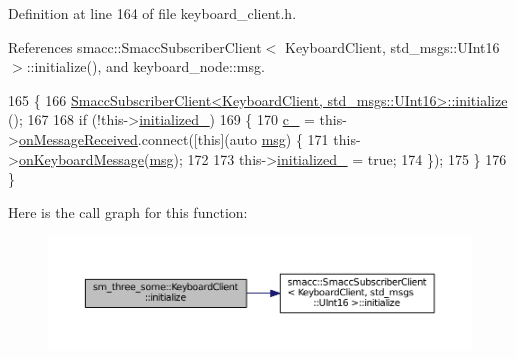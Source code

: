 Definition at line 164 of file keyboard\+\_\+client.\+h.



References smacc\+::\+Smacc\+Subscriber\+Client$<$ Keyboard\+Client, std\+\_\+msgs\+::\+U\+Int16 $>$\+::initialize(), and keyboard\+\_\+node\+::msg.


\begin{DoxyCode}
165         \{
166                 
      \hyperlink{classsmacc_1_1SmaccSubscriberClient_afc2e5523c38250722e7197dd535599ce}{SmaccSubscriberClient<KeyboardClient, std\_msgs::UInt16>::initialize}
      ();
167 
168                 \textcolor{keywordflow}{if} (!this->\hyperlink{classsm__three__some_1_1KeyboardClient_ab374495b4e0587afa6f09da97f4df615}{initialized\_})
169                 \{
170                         \hyperlink{classsm__three__some_1_1KeyboardClient_aa4505f5952e5caeb9ee4e1a7d6c85d53}{c\_} = this->\hyperlink{classsmacc_1_1SmaccSubscriberClient_afa92da03ebd637e2565eee5cf226ca43}{onMessageReceived}.connect([\textcolor{keyword}{this}](\textcolor{keyword}{auto} 
      \hyperlink{namespacekeyboard__node_a768777e12f75b89e4a0a60acf748e9eb}{msg}) \{
171                                 this->\hyperlink{classsm__three__some_1_1KeyboardClient_ad793e68532acd85b1e1fd17c8df827e5}{onKeyboardMessage}(\hyperlink{namespacekeyboard__node_a768777e12f75b89e4a0a60acf748e9eb}{msg});
172 
173                                 this->\hyperlink{classsm__three__some_1_1KeyboardClient_ab374495b4e0587afa6f09da97f4df615}{initialized\_} = \textcolor{keyword}{true};
174                         \});
175                 \}
176         \}
\end{DoxyCode}


Here is the call graph for this function\+:
\nopagebreak
\begin{figure}[H]
\begin{center}
\leavevmode
\includegraphics[width=350pt]{classsm__three__some_1_1KeyboardClient_a8a74266ba37df7f09518b9689ddee828_cgraph}
\end{center}
\end{figure}


